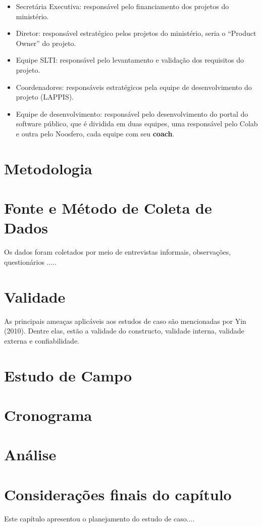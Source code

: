 \begin{itemize}

\item Secretária Executiva: responsável pelo financiamento dos projetos do ministério.

\item Diretor: responsável estratégico pelos projetos do ministério, seria o ``Product Owner'' do projeto.

\item Equipe SLTI: responsável pelo levantamento e validação dos requisitos do projeto.

\item Coordenadores: responsáveis estratégicos pela equipe de desenvolvimento do projeto (LAPPIS).

\item Equipe de desenvolvimento: responsável pelo desenvolvimento do portal do software público, que é dividida em duas equipes, uma responsável pelo Colab e outra pelo Noosfero, cada equipe com seu \textbf{coach}.

\end{itemize}

\section{Metodologia}

	

\section{Fonte e Método de Coleta de Dados}

Os dados foram coletados por meio de entrevistas informais, observações, questionários .....


\section{Validade}

As principais ameaças aplicáveis aos estudos de caso são mencionadas por Yin (2010). Dentre elas, estão a validade do constructo, validade interna, validade externa e confiabilidade. %

\section{Estudo de Campo}

\section{Cronograma}
\section{Análise}

\section{Considerações finais do capítulo}

Este capítulo apresentou o planejamento do estudo de caso....